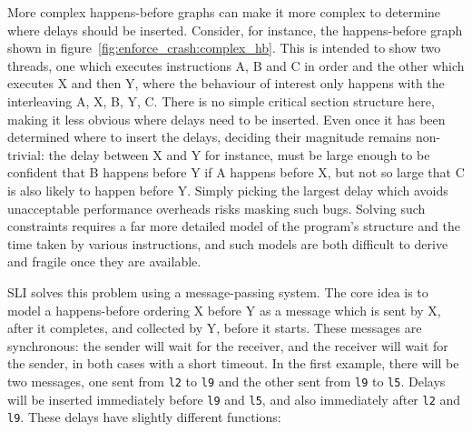 More complex happens-before graphs can make it more complex to
determine where delays should be inserted.  Consider, for instance,
the happens-before graph shown in
figure~\ref{fig:enforce_crash:complex_hb}.  This is intended to show
two threads, one which executes instructions A, B and C in order and
the other which executes X and then Y, where the behaviour of interest
only happens with the interleaving A, X, B, Y, C.  There is no simple
critical section structure here, making it less obvious where delays
need to be inserted.  Even once it has been determined where to insert
the delays, deciding their magnitude remains non-trivial: the delay
between X and Y for instance, must be large enough to be confident
that B happens before Y if A happens before X, but not so large that C
is also likely to happen before Y.  Simply picking the largest delay
which avoids unacceptable performance overheads risks masking such
bugs.  Solving such constraints requires a far more detailed model of
the program's structure and the time taken by various instructions,
and such models are both difficult to derive and fragile once they are
available.

SLI solves this problem using a message-passing system.  The core idea
is to model a happens-before ordering X before Y as a message which is
sent by X, after it completes, and collected by Y, before it starts.
These messages are synchronous: the sender will wait for the receiver,
and the receiver will wait for the sender, in both cases with a short
timeout.  In the first example, there will be two messages, one sent
from \verb|l2| to \verb|l9| and the other sent from \verb|l9| to
\verb|l5|.  Delays will be inserted immediately before \verb|l9| and
\verb|l5|, and also immediately after \verb|l2| and \verb|l9|.  These
delays have slightly different functions:

